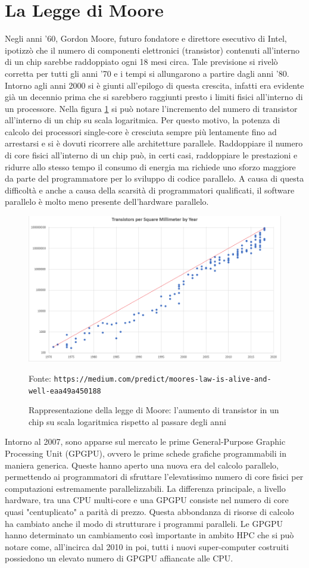 \documentclass[12pt,a4paper]{book}
\newcommand{\source}[1]{\caption*{Fonte: {\small\texttt{#1}}} }
\begin{document}
	\section{La Legge di Moore}
	Negli anni '60, Gordon Moore, futuro fondatore e direttore esecutivo di Intel, ipotizzò che il numero di componenti elettronici (transistor) contenuti all'interno di un chip sarebbe raddoppiato ogni 18 mesi circa. Tale previsione si rivelò corretta per tutti gli anni '70 e i tempi si allungarono a partire dagli anni '80. Intorno agli anni 2000 si è giunti all'epilogo di questa crescita, infatti era evidente già un decennio prima che si sarebbero raggiunti presto i limiti fisici all'interno di un processore. Nella figura \ref{fig:mooreslaw} si può notare l'incremento del numero di transistor all'interno di un chip su scala logaritmica. Per questo motivo, la potenza di calcolo dei processori single-core è cresciuta sempre più lentamente fino ad arrestarsi e si è dovuti ricorrere alle architetture parallele. Raddoppiare il numero di core fisici all'interno di un chip può, in certi casi, raddoppiare le prestazioni e ridurre allo stesso tempo il consumo di energia ma richiede uno sforzo maggiore da parte del programmatore per lo sviluppo di codice parallelo. A causa di questa difficoltà e anche a causa della scarsità di programmatori qualificati, il software parallelo è molto meno presente dell'hardware parallelo.
	
	\begin{figure}[!ht]
		\centering
		\includegraphics[width=0.7\linewidth]{Moores_Law}
		\caption[Legge di Moore]{Rappresentazione della legge di Moore: l'aumento di transistor in un chip su scala logaritmica rispetto al passare degli anni}
		\source{https://medium.com/predict/moores-law-is-alive-and-well-eaa49a450188}
		\label{fig:mooreslaw}
	\end{figure}
	
	Intorno al 2007, sono apparse sul mercato le prime General-Purpose Graphic Processing Unit (GPGPU), ovvero le prime schede grafiche programmabili in maniera generica. Queste hanno aperto una nuova era del calcolo parallelo, permettendo ai programmatori di sfruttare l'elevatissimo numero di core fisici per computazioni estremamente parallelizzabili. La differenza principale, a livello hardware, tra una CPU multi-core e una GPGPU consiste nel numero di core quasi "centuplicato" a parità di prezzo. Questa abbondanza di risorse di calcolo ha cambiato anche il modo di strutturare i programmi paralleli. Le GPGPU hanno determinato un cambiamento così importante in ambito HPC che si può notare come, all'incirca dal 2010 in poi, tutti i nuovi super-computer costruiti possiedono un elevato numero di GPGPU affiancate alle CPU.
	
\end{document}
